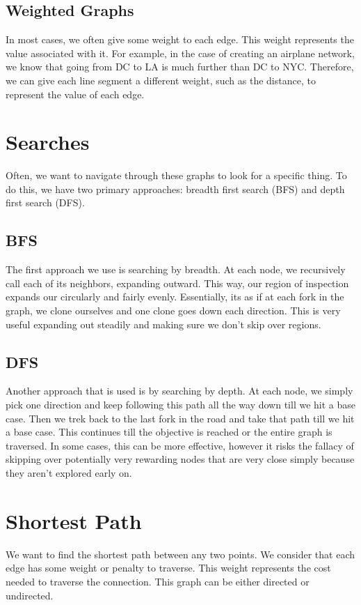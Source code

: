 \documentclass{article}
\begin{document}
\subsection{Weighted Graphs}
In most cases, we often give some weight to each edge. This weight represents the value associated with it. For example, in the case of creating an airplane network, we know that going from DC to LA is much further than DC to NYC. Therefore, we can give each line segment a different weight, such as the distance, to represent the value of each edge.

\section{Searches}
Often, we want to navigate through these graphs to look for a specific thing. To do this, we have two primary approaches: breadth first search (BFS) and depth first search (DFS).

\subsection{BFS}
The first approach we use is searching by breadth. At each node, we recursively call each of its neighbors, expanding outward. This way, our region of inspection expands our circularly and fairly evenly. Essentially, its as if at each fork in the graph, we clone ourselves and one clone goes down each direction. This is very useful expanding out steadily and making sure we don't skip over regions.

\subsection{DFS}
Another approach that is used is by searching by depth. At each node, we simply pick one direction and keep following this path all the way down till we hit a base case. Then we trek back to the last fork in the road and take that path till we hit a base case. This continues till the objective is reached or the entire graph is traversed. In some cases, this can be more effective, however it risks the fallacy of skipping over potentially very rewarding nodes that are very close simply because they aren't explored early on.

\section{Shortest Path}

We want to find the shortest path between any two points. We consider that each edge has some weight or penalty to traverse. This weight represents the cost needed to traverse the connection. This graph can be either directed or undirected.
\end{document}
